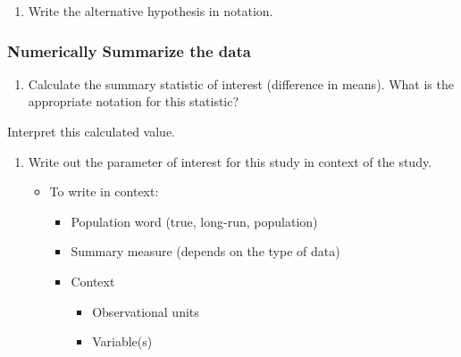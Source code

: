 \documentclass[
]{report}
\providecommand{\tightlist}{%
  \setlength{\itemsep}{0pt}\setlength{\parskip}{0pt}}
\begin{document}
\begin{enumerate}
\def\labelenumi{\arabic{enumi}.}
\setcounter{enumi}{4}
\tightlist
\item
  Write the alternative hypothesis in notation.
\end{enumerate}

\vspace{0.5in}

\subsubsection*{Numerically Summarize the data}\label{numerically-summarize-the-data}

\begin{enumerate}
\def\labelenumi{\arabic{enumi}.}
\setcounter{enumi}{5}
\tightlist
\item
  Calculate the summary statistic of interest (difference in means). What is the appropriate notation for this statistic?
\end{enumerate}

\vspace{0.5in}

Interpret this calculated value.

\vspace{0.6in}

\begin{enumerate}
\def\labelenumi{\arabic{enumi}.}
\setcounter{enumi}{6}
\item
  Write out the parameter of interest for this study in context of the study.

  \begin{itemize}
  \item
    To write in context:

    \begin{itemize}
    \item
      Population word (true, long-run, population)
    \item
      Summary measure (depends on the type of data)
    \item
      Context

      \begin{itemize}
      \item
        Observational units
      \item
        Variable(s)
        \vspace{1in}
      \end{itemize}
    \end{itemize}
  \end{itemize}
\end{enumerate}
\end{document}
